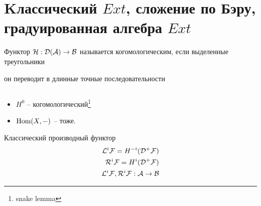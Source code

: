 \documentclass[../main.tex]{subfiles}
\begin{document}
\section{Kлассический $Ext$, сложение по Бэру, градуированная алгебра $Ext$}
 \begin{to_def}
Функтор $\mathcal{H}: \mathcal{D(A)}\rightarrow\mathcal{B}$ называется когомологическим, если выделенные треугольники  он переводит в длинные точные последовательности
\end{to_def}
\begin{to_ex}
$ $
\begin{itemize}
    \item $H^0$ -- когомологический\footnote{snake lemma}
    \item $\operatorname{Hom}(X, -)$ -- тоже.
\end{itemize}
\end{to_ex}
\begin{to_def}
 \label{classicDerFunc}
Классический производный функтор 
\begin{align*}
    \mathcal{L}^{i}\mathcal{F} = H^{-i}(\mathcal{D^+ F})\\
    \mathcal{R}^{i}\mathcal{F} = H^{i}(\mathcal{D^+ F})\\
    \mathcal{L}^{i}\mathcal{F}, \mathcal{R}^{i}\mathcal{F}: \mathcal{A} \rightarrow \mathcal{B}
\end{align*}
\end{to_def}
\end{document}
